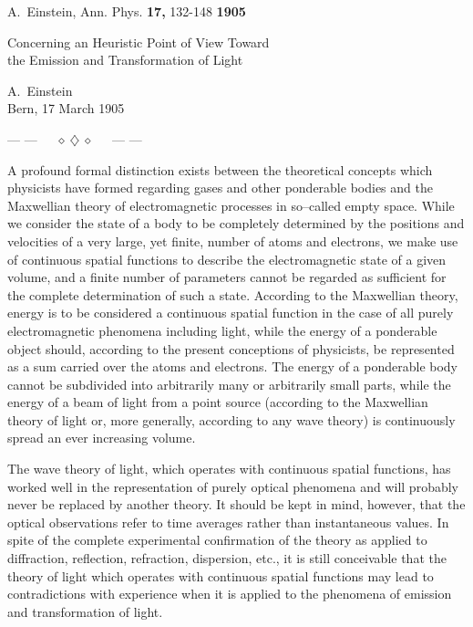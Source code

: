 \documentclass[12pt]{article}
\begin{document}
A.~Einstein, Ann. Phys. {\bf 17,} 132-148 \hfill {\large \bf 1905}\\[2cm]

\begin{center}
{\Large Concerning an Heuristic Point of View Toward\\
the Emission and Transformation of Light}\\
\end{center}

\vspace{0.5cm}

\begin{center}
A.~Einstein\\
Bern, 17 March 1905
\end{center}

\centerline{--- ---~~~$\diamond~\diamondsuit~\diamond$~~~--- ---}

\vspace{1cm}

A profound formal distinction  exists between the theoretical concepts
which  physicists have  formed  regarding  gases and  other ponderable
bodies  and the  Maxwellian  theory of   electromagnetic  processes in
so--called empty  space. While we  consider the  state of a body to be
completely determined by the positions and velocities of a very large,
yet finite, number of  atoms and electrons,  we make use of continuous
spatial  functions to  describe the  electromagnetic  state of a given
volume,  and a  finite  number of   parameters  cannot be  regarded as
sufficient for the  complete determination of  such a state. According
to the  Maxwellian  theory, energy  is to be  considered  a continuous
spatial function in the case of  all purely electromagnetic phenomena
including  light,  while the  energy of  a  ponderable  object should,
according to the present  conceptions of physicists, be represented as
a sum carried over the atoms and electrons. The energy of a ponderable
body cannot be  subdivided into arbitrarily  many or arbitrarily small
parts,  while  the  energy of  a beam  of  light from  a  point source
(according  to the   Maxwellian theory  of light  or, more  generally,
according   to any  wave theory) is continuously  spread  an ever
increasing volume.

The wave  theory  of light,  which  operates  with  continuous spatial
functions,  has worked well  in the  representation of  purely optical
phenomena and  will probably never  be replaced by  another theory. It
should be kept in  mind, however, that the  optical observations refer
to time  averages rather  than  instantaneous values.  In spite of the
complete  experimental   confirmation of the  theory as  applied to
diffraction,  reflection,  refraction,  dispersion,  etc., it is still
conceivable that  the theory of  light which  operates with continuous
spatial functions may  lead to contradictions  with experience when it
is applied to the phenomena of emission and transformation of light. 
\end{document}
